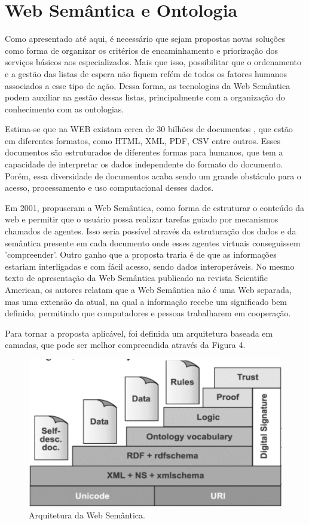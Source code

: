 \section{Web Semântica e Ontologia}

    Como apresentado até aqui, é necessário que sejam propostas novas soluções como forma de organizar os critérios de encaminhamento e priorização dos serviços básicos aos especializados. Mais que isso, possibilitar que o ordenamento e a gestão das listas de espera não fiquem refém de todos os fatores humanos associados a esse tipo de ação. Dessa forma, as tecnologias da Web Semântica podem auxiliar na gestão dessas listas, principalmente com a organização do conhecimento com as ontologias.
    
    Estima-se que na WEB existam cerca de 30 bilhões de documentos \cite{calderon2017deep}, que estão em diferentes formatos, como HTML, XML, PDF, CSV entre outros. Esses documentos são estruturados de diferentes formas para humanos, que tem a capacidade de interpretar os dados independente do formato do documento. Porém, essa diversidade de documentos acaba sendo um  grande obstáculo para o acesso, processamento e uso computacional desses dados.
    
    Em 2001,  propuseram a Web Semântica, como forma de estruturar o conteúdo da web e permitir que o usuário possa realizar tarefas guiado por mecanismos chamados de agentes. Isso seria possível através da estruturação dos dados e da semântica presente em cada documento onde esses agentes virtuais conseguissem 'compreender'. Outro ganho que a proposta traria é de que as informações estariam interligadas e com fácil acesso, sendo dados interoperáveis.
    No mesmo texto de apresentação da Web Semântica publicado na revista Scientific American, os autores relatam que a Web Semântica não é uma Web separada, mas uma extensão da atual, na qual a informação recebe um significado bem definido, permitindo que computadores e pessoas trabalharem em cooperação.
    
   Para tornar a proposta aplicável, foi definida um arquitetura baseada em camadas, que pode ser melhor compreendida através da Figura 4.
   
     \begin{figure}[htb]
    	\centering
        \caption{Arquitetura da Web Semântica.}
    	\label{fig:semanticcake}
        \includegraphics[width=0.7\linewidth]{images/semantic-cake}
    \end{figure}
    
